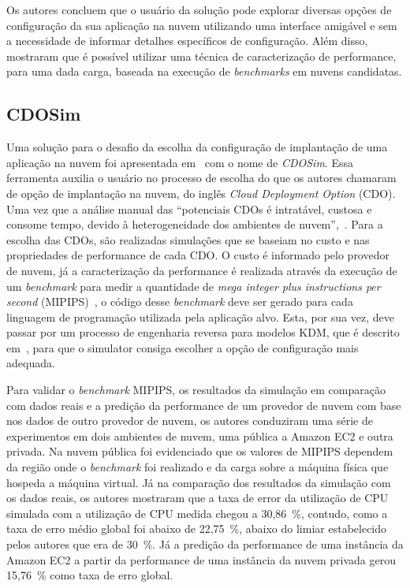 Os autores concluem que o usuário da solução pode explorar diversas opções de configuração da sua aplicação na nuvem utilizando uma interface amigável e sem a necessidade de informar detalhes específicos de configuração. Além disso, mostraram que é possível utilizar uma técnica de caracterização de performance, para uma dada carga, baseada na execução de {\em benchmarks} em nuvens candidatas.

\subsection{CDOSim}
Uma solução para o desafio da escolha da configuração de implantação de uma aplicação na nuvem foi apresentada em~\cite{fittkau2012cdosim} com o nome de \textit{CDOSim}. Essa ferramenta auxilia o usuário no processo de escolha do que os autores chamaram de opção de implantação na nuvem, do inglês \textit{Cloud Deployment Option} (CDO). Uma vez que a análise manual das ``potenciais CDOs é intratável, custosa e consome tempo, devido à heterogeneidade dos ambientes de nuvem'',~\cite{fittkau2012cdosim}. Para a escolha das CDOs, são realizadas simulações que se baseiam no custo e nas propriedades de performance de cada CDO. O custo é informado pelo provedor de nuvem, já a caracterização da performance é realizada através da execução de um \textit{benchmark} para medir a quantidade de \textit{mega integer plus instructions per second} (MIPIPS)~\cite{fittkau2012cdosim}, o código desse \textit{benchmark} deve ser gerado para cada linguagem de programação utilizada pela aplicação alvo. Esta, por sua vez, deve passar por um processo de engenharia reversa para modelos KDM, que é descrito em~\cite{perez2011knowledge}, para que o simulator consiga escolher a opção de configuração mais adequada.

Para validar o \textit{benchmark} MIPIPS, os resultados da simulação em comparação com dados reais e a predição da performance de um provedor de nuvem com base nos dados de outro provedor de nuvem, os autores conduziram uma série de experimentos em dois ambientes de nuvem, uma pública a Amazon EC2 e outra privada. Na nuvem pública foi evidenciado que os valores de MIPIPS dependem da região onde o \textit{benchmark} foi realizado e da carga sobre a máquina física que hospeda a máquina virtual. Já na comparação dos resultados da simulação com os dados reais, os autores mostraram que a taxa de error da utilização de CPU simulada com a utilização de CPU medida chegou a 30,86~\%, contudo, como a taxa de erro médio global foi abaixo de 22,75~\%, abaixo do limiar estabelecido pelos autores que era de 30~\%. Já a predição da performance de uma instância da Amazon EC2 a partir da performance de uma instância da nuvem privada gerou 15,76~\% como taxa de erro global.

